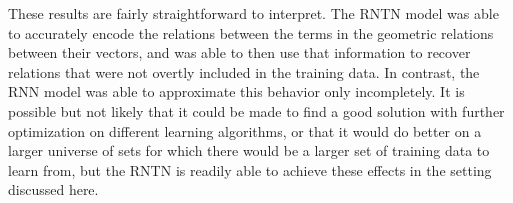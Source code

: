 




These results are fairly straightforward to interpret. The RNTN model
was able to accurately encode the relations between the terms in the
geometric relations between their vectors, and was able to then use
that information to recover relations that were not overtly included
in the training data. In contrast, the RNN model was able to
approximate this behavior only incompletely. It is possible but not
likely that it could be made to find a good solution with further
optimization on different learning algorithms, or that it would do
better on a larger universe of sets for which there would be a larger
set of training data to learn from, but the RNTN is readily able to achieve
these effects in the setting discussed here.


